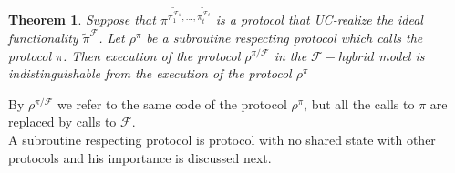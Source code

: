 \documentclass{acm_proc_article-sp}
\begin{document}
\newtheorem{theorem}{Theorem}

\begin{theorem}
Suppose that
$\pi^{
    \tilde{\pi_1^{\mathcal{F}_1}},
    \ldots,
    \tilde{\pi_t^{\mathcal{F}_t}}}$
is a protocol that UC-realize the ideal functionality $\tilde{\pi}^{\mathcal{F}}$. Let $\rho^\pi$
be a subroutine respecting protocol which calls the protocol $\pi$. Then execution of the protocol
$\rho^{\pi/\mathcal{F}}$ in
the $\mathcal{F}-hybrid$ model is indistinguishable from the execution of the protocol $\rho^\pi$
\end{theorem}

By $\rho^{\pi/\mathcal{F}}$ we refer to the same code of the protocol $\rho^\pi$, but all the calls to $\pi$
are replaced by calls to $\mathcal{F}$.\\
A subroutine respecting protocol is protocol with no shared state with other protocols and his importance
is discussed next.\\
\end{document}
